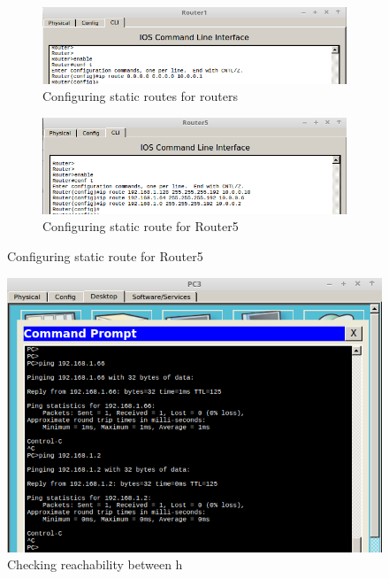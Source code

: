 \documentclass{article}
\begin{document}
\begin{figure}[h]

\begin{subfigure}{0.5\textwidth}
       \includegraphics[width=\textwidth]{5routerdefgw}
    \caption{Configuring static routes for routers}
    \label{fig:5routerdefgw}
\end{subfigure}
%
\begin{subfigure}{0.5\textwidth}
 \includegraphics[width=\textwidth]{5router5def}
    \caption{Configuring static route for Router5}
    \label{fig:5router5def}
\end{subfigure}

\end{figure}

\begin{figure}[h]
    \centering
    \includegraphics[scale=0.3]{5pingtest}
    \caption{Checking reachability between h}
    \label{fig:5pingtest}
\end{figure}
\end{document}
